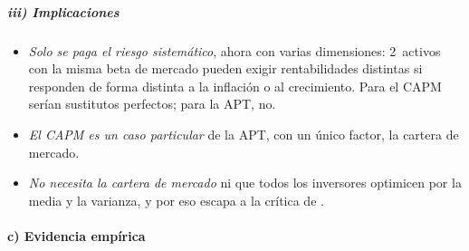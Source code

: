 \documentclass[11pt]{article}
\begin{document}
\subparagraph{iii) Implicaciones}

\begin{itemize}
\item \emph{Solo se paga el riesgo sistemático}, ahora con varias dimensiones: 2~activos con la misma beta de mercado pueden exigir rentabilidades distintas si responden de forma distinta a la inflación o al crecimiento. Para el CAPM serían sustitutos perfectos; para la APT, no.
\item \emph{El CAPM es un caso particular} de la APT, con un único factor, la cartera de mercado.
\item \emph{No necesita la cartera de mercado} ni que todos los inversores optimicen por la media y la varianza, y por eso escapa a la crítica de .
\end{itemize}

\paragraph{c) Evidencia empírica}
\end{document}
